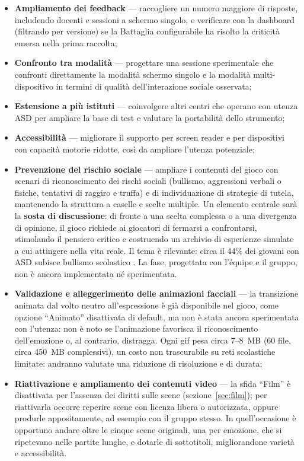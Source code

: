 \documentclass[12pt]{report}
\begin{document}
\begin{itemize}
    \item \textbf{Ampliamento dei feedback} --- raccogliere un numero maggiore di risposte, includendo docenti e sessioni a schermo singolo, e verificare con la dashboard (filtrando per versione) se la Battaglia configurabile ha risolto la criticità emersa nella prima raccolta;
    \item \textbf{Confronto tra modalità} --- progettare una sessione sperimentale che confronti direttamente la modalità schermo singolo e la modalità multi-dispositivo in termini di qualità dell'interazione sociale osservata;
    \item \textbf{Estensione a più istituti} --- coinvolgere altri centri che operano con utenza ASD per ampliare la base di test e valutare la portabilità dello strumento;
    \item \textbf{Accessibilità} --- migliorare il supporto per screen reader e per dispositivi con capacità motorie ridotte, così da ampliare l'utenza potenziale;
    \item \textbf{Prevenzione del rischio sociale} --- ampliare i contenuti del gioco con scenari di riconoscimento dei rischi sociali (bullismo, aggressioni verbali o fisiche, tentativi di raggiro e truffa) e di individuazione di strategie di tutela, mantenendo la struttura a caselle e scelte multiple. Un elemento centrale sarà la \textbf{sosta di discussione}: di fronte a una scelta complessa o a una divergenza di opinione, il gioco richiede ai giocatori di fermarsi a confrontarsi, stimolando il pensiero critico e costruendo un archivio di esperienze simulate a cui attingere nella vita reale. Il tema è rilevante: circa il 44\% dei giovani con ASD subisce bullismo scolastico \cite{maiano2016}. La fase, progettata con l'équipe e il gruppo, non è ancora implementata né sperimentata.
    \item \textbf{Validazione e alleggerimento delle animazioni facciali} --- la transizione animata dal volto neutro all'espressione è già disponibile nel gioco, come opzione ``Animato'' disattivata di default, ma non è stata ancora sperimentata con l'utenza: non è noto se l'animazione favorisca il riconoscimento dell'emozione o, al contrario, distragga. Ogni gif pesa circa 7--8~MB (60 file, circa 450~MB complessivi), un costo non trascurabile su reti scolastiche limitate: andranno valutate una riduzione di risoluzione e di durata;
    \item \textbf{Riattivazione e ampliamento dei contenuti video} --- la sfida ``Film'' è disattivata per l'assenza dei diritti sulle scene (sezione~\ref{sec:film}); per riattivarla occorre reperire scene con licenza libera o autorizzata, oppure produrle appositamente, ad esempio con il gruppo stesso. In quell'occasione è opportuno andare oltre le cinque scene originali, una per emozione, che si ripetevano nelle partite lunghe, e dotarle di sottotitoli, migliorandone varietà e accessibilità.
\end{itemize}

%
%

\beforebibliography



\end{document}

